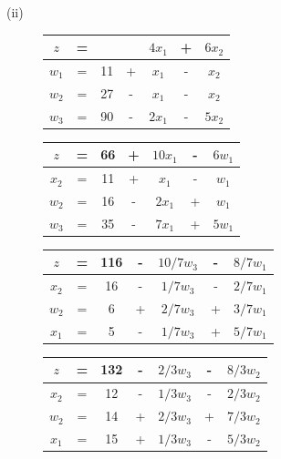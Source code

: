 \documentclass{article}
\begin{document}
	(ii)
	\begin{figure}[!h]
		\begin{tabular}{c c c c c c c}
			$z$ & = & & & $4x_1$ & + & $6x_2$ \\
			\hline
			$w_1$ & = & 11 & + &$x_1$& - &$x_2$ \\
			$w_2$ & = & 27 & - & $x_1$ & - & $x_2$ \\
			$w_3$ & = & 90 & - & $2x_1$ & - & $5x_2 $ \\
			\hline
		\end{tabular}
	\end{figure}
	
	\begin{figure}[!h]
		\begin{tabular}{c c c c c c c}
			$z$ & = & 66 & + & $10x_1$ & - & $6w_1$ \\
			\hline
			$x_2$ & = & 11 & + &$x_1$& - &$w_1$ \\
			$w_2$ & = & 16 & - & $2 x_1$ & + & $w_1$ \\
			$w_3$ & = & 35 & - & $7 x_1$ & + & $5w_1 $ \\
			\hline
		\end{tabular}
	\end{figure}	

	\begin{figure}[!h]
		\begin{tabular}{c c c c c c c}
			$z$ & = & 116 & - & $10/7 w_3 $ & - & $8/7 w_1$ \\
			\hline
			$x_2$ & = & 16 & - &$1/7 w_3 $& - &$2/7 w_1$ \\
			$w_2$ & = & 6 & + & $2/7 w_3 $ & + & $3/7 w_1$ \\
			$x_1$ & = & 5 & - & $1/7 w_3$ & + & $5/7 w_1 $ \\
			\hline
		\end{tabular}
	\end{figure}	

	\newpage
	\begin{figure}[!h]
		\begin{tabular}{c c c c c c c}
			$z$ & = & 132 & - & $2/3 w_3 $ & - & $8/3 w_2$ \\
			\hline
			$x_2$ & = & 12 & - &$1/3 w_3 $& - &$2/3 w_2$ \\
			$w_2$ & = & 14 & + & $2/3 w_3 $ & + & $7/3 w_2$ \\
			$x_1$ & = & 15 & + & $1/3 w_3$ & - & $5/3 w_2 $ \\
			\hline
		\end{tabular}
	\end{figure}	
	
\end{document}

